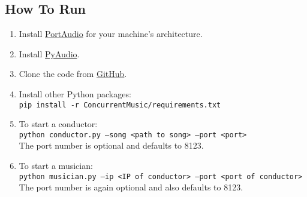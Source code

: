 \documentclass[12pt, letterpaper]{article}
\begin{document}
\subsection{How To Run}
\begin{enumerate}
\item Install \href{http://www.portaudio.com/}{PortAudio} for your machine's architecture.
\item Install \href{http://people.csail.mit.edu/hubert/pyaudio/}{PyAudio}.
\item Clone the code from \href{https://github.com/TylerLubeck/ConcurrentMusic}{GitHub}.
\item Install other Python packages:\\
\texttt{pip install -r ConcurrentMusic/requirements.txt}
\item To start a conductor:\\
\texttt{python conductor.py --song <path to song> --port <port>}\\
The port number is optional and defaults to 8123.
\item To start a musician:\\
\texttt{python musician.py --ip <IP of conductor> --port <port of conductor>}\\
The port number is again optional and also defaults to 8123.
\end{enumerate}
\end{document}
